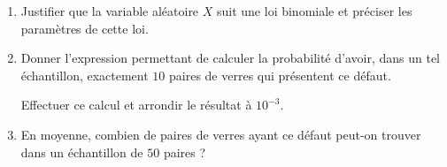 \documentclass[10pt]{article}
\begin{document}
\medskip

\begin{enumerate}
\item Justifier que la variable aléatoire $X$ suit une loi binomiale et préciser les paramètres de cette loi.
\item Donner l'expression permettant de calculer la probabilité d'avoir, dans un tel échantillon, exactement $10$ paires de verres qui présentent ce défaut.

Effectuer ce calcul et arrondir le résultat à $10^{-3}$.
\item En moyenne, combien de paires de verres ayant ce défaut peut-on trouver dans un échantillon de $50$ paires ?
\end{enumerate}
\end{document}
